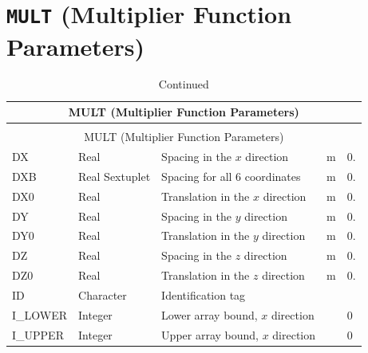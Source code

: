 \documentclass[11pt]{book}
\begin{document}
\vspace{\baselineskip}

\section{\texorpdfstring{{\tt MULT}}{MULT} (Multiplier Function Parameters)}

\begin{longtable}{@{\extracolsep{\fill}}|l|l|l|l|l|}
\caption[Multiplier function parameters ({\ct MULT} namelist group)]{For more information see Section~\ref{info:MULT}.}
\label{tbl:MULT} \\
\hline
\multicolumn{5}{|c|}{{\ct MULT} (Multiplier Function Parameters)} \\
\hline \hline
\endfirsthead
\caption[]{Continued} \\
\hline
\multicolumn{5}{|c|}{{\ct MULT} (Multiplier Function Parameters)} \\
\hline \hline
\endhead
{\ct DX}             & Real             & Spacing in the $x$ direction                & m  & 0.                         \\ \hline
{\ct DXB}            & Real Sextuplet   & Spacing for all 6 coordinates               & m  & 0.                         \\ \hline
{\ct DX0}            & Real             & Translation in the $x$ direction            & m  & 0.                         \\ \hline
{\ct DY}             & Real             & Spacing in the $y$ direction                & m  & 0.                         \\ \hline
{\ct DY0}            & Real             & Translation in the $y$ direction            & m  & 0.                         \\ \hline
{\ct DZ}             & Real             & Spacing in the $z$ direction                & m  & 0.                         \\ \hline
{\ct DZ0}            & Real             & Translation in the $z$ direction            & m  & 0.                         \\ \hline
{\ct ID }            & Character        & Identification tag                          &    &                            \\ \hline
{\ct I\_LOWER}       & Integer          & Lower array bound, $x$ direction            &    & 0                          \\ \hline
{\ct I\_UPPER}       & Integer          & Upper array bound, $x$ direction            &    & 0                          \\ \hline

\end{longtable}
\end{document}
